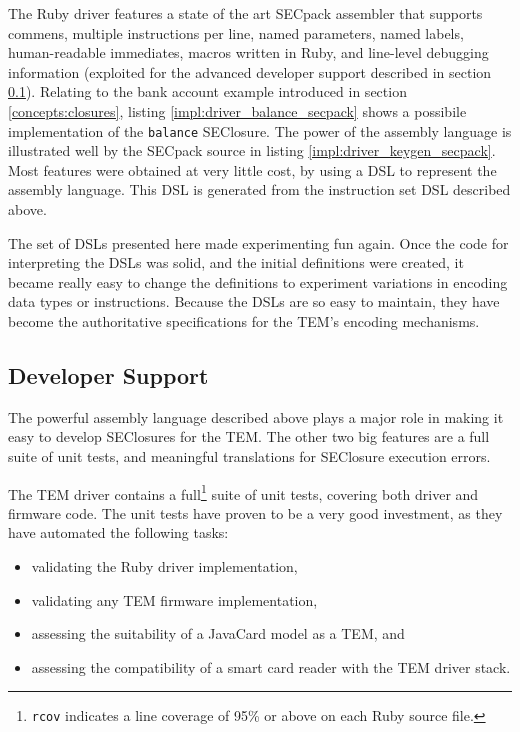 

The Ruby driver features a state of the art SECpack assembler that supports
commens, multiple instructions per line, named parameters, named labels,
human-readable immediates, macros written in Ruby, and line-level debugging
information (exploited for the advanced developer support described  in section
\ref{impl:driver_dev_support}). Relating to the bank account example introduced
in section \ref{concepts:closures}, listing \ref{impl:driver_balance_secpack}
shows a possibile implementation of the \texttt{balance} SEClosure. The power of
the assembly language is illustrated well by the SECpack source in listing
\ref{impl:driver_keygen_secpack}. Most features were obtained at very little
cost, by using a DSL to represent the assembly language. This DSL is generated
from the instruction set DSL described above.





The set of DSLs presented here made experimenting fun again. Once the code for
interpreting the DSLs was solid, and the initial definitions were created, it
became really easy to change the definitions to experiment variations in
encoding data types or instructions. Because the DSLs are so easy to maintain,
they have become the authoritative specifications for the TEM's encoding
mechanisms.

\subsection{Developer Support}\label{impl:driver_dev_support}
The powerful assembly language described above plays a major role in making it
easy to develop SEClosures for the TEM. The other two big features are a full
suite of unit tests, and meaningful translations for SEClosure execution errors.

The TEM driver contains a full\footnote{\texttt{rcov} indicates a line coverage
of 95\% or above on each Ruby source file.} suite of unit tests, covering both
driver and firmware code. The unit tests have proven to be a very good
investment, as they have automated the following tasks:
\begin{itemize}
  \item validating the Ruby driver implementation,
  \item validating any TEM firmware implementation, 
  \item assessing the suitability of a JavaCard model as a TEM, and
  \item assessing the compatibility of a smart card reader with the TEM driver
  stack.
\end{itemize}

